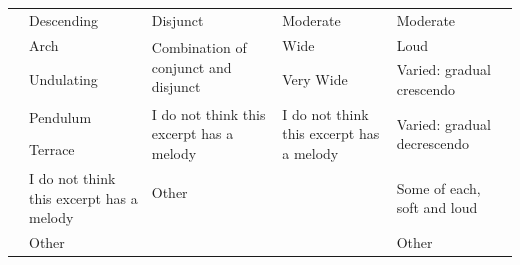 \documentclass[
]{article}
\newenvironment{lltable}{\begin{landscape}\begin{center}\begin{ThreePartTable}}{\end{ThreePartTable}\end{center}\end{landscape}}
\begin{document}
\begin{lltable}
\begin{footnotesize}
\begin{longtable}{p{}p{}p{}p{}p{}p{}}
  & Descending & Disjunct & Moderate & Moderate  & \\
  & Arch & \multirow{2}{0.2\textwidth}{Combination of conjunct and disjunct} & Wide & Loud  & \\
  & Undulating &  & Very Wide & Varied: gradual crescendo &\\
  & Pendulum & \multirow{2}{0.2\textwidth}{I do not think this excerpt has a melody} & \multirow{2}{0.2\textwidth}{I do not think this excerpt has a melody} & \multirow{2}{0.2\textwidth}{Varied: gradual decrescendo} &\\
  & Terrace & & & & \\
  & \multirow{2}{0.2\textwidth}{I do not think this excerpt has a melody} & Other & & \multirow{2}{0.2\textwidth}{Some of each, soft and loud}  &\\
  & & & & & \\
  & Other & & & Other & \\
  
\cmidrule[.75pt]{2-5}
\end{longtable}
\end{footnotesize}
\end{lltable}
\end{document}
